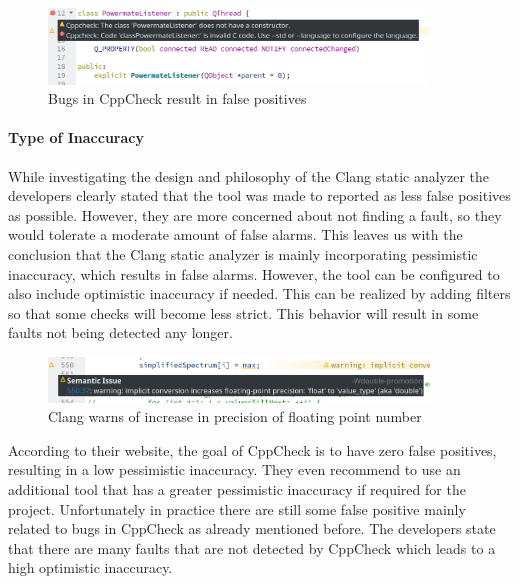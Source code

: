 \documentclass{scrartcl}
\begin{document}
\begin{figure}[h]
	\centering
	\includegraphics[width=0.9\textwidth]{img/cppcheck_fp_missing_ctor}
	\caption[Bugs in CppCheck]{Bugs in CppCheck result in false positives}
	\label{fig:cppcheck_fp_missing_ctor}
\end{figure}

\paragraph{Type of Inaccuracy}

While investigating the design and philosophy of the Clang static analyzer the developers clearly stated that the tool was made to reported as less false positives as possible. However, they are more concerned about not finding a fault, so they would tolerate a moderate amount of false alarms. This leaves us with the conclusion that the Clang static analyzer is mainly incorporating pessimistic inaccuracy, which results in false alarms. However, the tool can be configured to also include optimistic inaccuracy if needed. This can be realized by adding filters so that some checks will become less strict. This behavior will result in some faults not being detected any longer.

\begin{figure}[h]
	\centering
	\includegraphics[width=0.9\textwidth]{img/clang_fp_implicit_precision_increase}
	\caption[Clang warns of increase in precision]{Clang warns of increase in precision of floating point number}
	\label{fig:clang_fp_implicit_precision_increase}
\end{figure}

According to their website, the goal of CppCheck is to have zero false positives, resulting in a low pessimistic inaccuracy. They even recommend to use an additional tool that has a greater pessimistic inaccuracy if required for the project. Unfortunately in practice there are still some false positive mainly related to bugs in CppCheck as already mentioned before. The developers state that there are many faults that are not detected by CppCheck which leads to a high optimistic inaccuracy.
\end{document}
